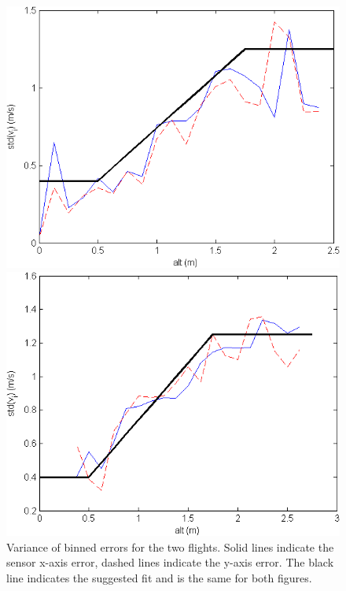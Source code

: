 \documentclass{article}
\begin{document}
\begin{figure}
\centering
\begin{minipage}{0.49\textwidth}
\includegraphics[width=\textwidth]{../flow figures/resids_v_alt1_bins.png}
\end{minipage}
\begin{minipage}{0.49\textwidth}
\includegraphics[width=\textwidth]{../flow figures/resids_v_alt2_bins.png}
\end{minipage}
\caption{Variance of binned errors for the two flights. Solid lines indicate the sensor x-axis error, dashed lines indicate the y-axis error. The black line indicates the suggested fit and is the same for both figures.}
\label{fig:resids_v_alt_bins}
\end{figure}
\end{document}
